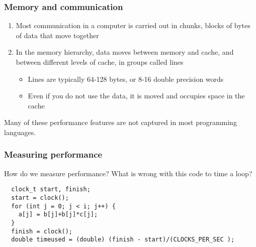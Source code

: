 \documentclass{beamer}
\begin{document}
\begin{frame}
\frametitle{Memory and communication}

\begin{enumerate}
\item Most communication in a computer is carried out in chunks, blocks of bytes of data that move together

\item In the memory hierarchy, data moves between memory and cache, and between different levels of cache, in groups called lines
\begin{itemize}

 \item Lines are typically 64-128 bytes, or 8-16 double precision words

 \item Even if you do not use the data, it is moved and occupies space in the cache
\end{itemize}

\noindent
\end{enumerate}

\noindent
Many of these  performance features are not captured in most programming languages.
\end{frame}

\begin{frame}
\frametitle{Measuring performance}

How do we measure performance? What is wrong with this code to time a loop?








\begin{verbatim}
  clock_t start, finish;
  start = clock();
  for (int j = 0; j < i; j++) {
    a[j] = b[j]+b[j]*c[j];
  }
  finish = clock();
  double timeused = (double) (finish - start)/(CLOCKS_PER_SEC );

\end{verbatim}
\end{frame}
\end{document}
